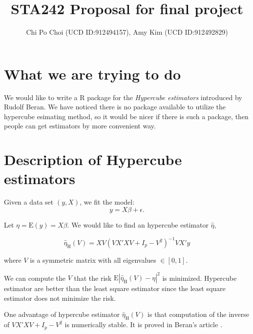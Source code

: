 \documentclass[draft]{article}
\title{STA242 Proposal for final project}
\author{Chi Po Choi (UCD ID:912494157), Amy Kim (UCD ID:912492829)}
\begin{document}
\maketitle

\section{What we are trying to do}
We would like to write a R package for the \emph{Hypercube estimators} \cite{beran2014hypercube} introduced by Rudolf Beran. We have noticed there is no package available to utilize the hypercube esimating method, so it would be nicer if there is such a package, then people can get estimators by more convenient way. 

\section{Description of Hypercube estimators}
Given a data set $(y, X)$, we fit the model:
$$
y = X\beta + \epsilon.
$$



Let $\eta = \text{E}(y) = X\beta$. We would like to find an hypercube estimator $\hat{\eta}$,

$$
\hat{\eta}_\text{H} (V) = X V (V X'X V + I_p - V^2)^{-1} V X' y
$$

where $V$ is a symmetric matrix with all eigenvalues $\in [0,1]$.

We can compute the $V$ that the risk $\text{E} | \hat{\eta}_\text{H}(V) - \eta|^2$ is minimized. Hypercube estimator are better than the least square estimator since the least square estimator does not minimize the risk.

One advantage of hypercube estimator $\hat{\eta}_\text{H} (V)$ is that computation of the inverse of $V X'X V + I_p - V^2$ is numerically stable. It is proved in Beran's article \cite{beran2014hypercube}.
\end{document}
